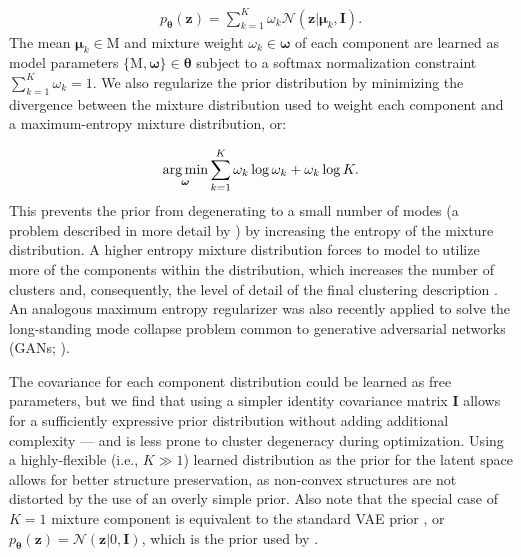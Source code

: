 \begin{align}
    p_{\boldsymbol{\theta}}(\mathbf{z}) = \sum_{k=1}^K \omega_k \mathcal{N}(\mathbf{z}| \boldsymbol{\mu}_k, \mathbf{I}). \label{eq:mixture_prior}
\end{align}
The mean $\boldsymbol{\mu}_k \in \boldsymbol{\mathrm{M}}$  and mixture weight $\omega_k \in \boldsymbol{\omega}$ of each component are learned as model parameters $\{\boldsymbol{\mathrm{M}}, \boldsymbol{\omega}\} \in \boldsymbol{\theta}$ subject to a softmax normalization constraint $\sum_{k=1}^K \omega_k = 1$. We also regularize the prior distribution by minimizing the divergence between the mixture distribution used to weight each component and a maximum-entropy mixture distribution, or:

\begin{equation}
   \operatorname*{arg\,min}_{\boldsymbol{\omega}} \sum_{k=1}^K \omega_{k} \log{\omega_{k}} + \omega_{k} \log{K}.
\end{equation}
This prevents the prior from degenerating to a small number of modes (a problem described in more detail by \citealt{kingma2014semi, dilokthanakul2016gmvae}) by increasing the entropy of the mixture distribution. A higher entropy mixture distribution forces to model to utilize more of the components within the distribution, which increases the number of clusters and, consequently, the level of detail of the final clustering description \citep{still2004many}. An analogous maximum entropy regularizer was also recently applied to solve the long-standing mode collapse problem common to generative adversarial networks (GANs; \citealt{dieng2019prescribed}).


 
The covariance for each component distribution could be learned as free parameters, but we find that using a simpler  identity covariance matrix $\mathbf{I}$ allows for a sufficiently expressive prior distribution without adding additional complexity --- and is less prone to cluster degeneracy during optimization. Using a highly-flexible (i.e., $K \gg 1$) learned distribution as the prior for the latent space allows for better structure preservation, as non-convex structures are not distorted by the use of an overly simple prior. Also note that the special case of $K=1$ mixture component is equivalent to the standard VAE prior \citep{kingma2013vae}, or $p_{\boldsymbol{\theta}}(\mathbf{z}) = \mathcal{N}(\mathbf{z}|0, \mathbf{I})$, which is the prior used by \cite{ding2018scvis}.

